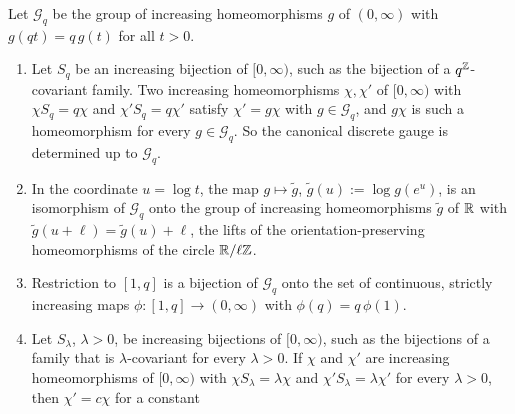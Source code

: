 \begin{lemma}
\label{lem:gauge-group}
\leanok
{}
Let $\mathcal{G}_q$ be the group of increasing homeomorphisms $g$ of $(0,\infty)$ with
$g(qt) = q\,g(t)$ for all $t > 0$.
\begin{enumerate}
\item Let $S_q$ be an increasing bijection of $[0,\infty)$, such as the bijection of a
$q^{\mathbb{Z}}$-covariant family. Two increasing homeomorphisms
$\chi, \chi'$ of $[0,\infty)$ with $\chi S_q = q\chi$ and $\chi'S_q = q\chi'$ satisfy
$\chi' = g\chi$ with $g \in \mathcal{G}_q$, and $g\chi$ is such a homeomorphism for every
$g \in \mathcal{G}_q$. So the canonical discrete gauge is determined up to $\mathcal{G}_q$.
\item In the coordinate $u = \log t$, the map $g \mapsto \tilde g$,
$\tilde g(u) := \log g(e^u)$, is an isomorphism of $\mathcal{G}_q$ onto the group of increasing
homeomorphisms $\tilde g$ of $\mathbb{R}$ with $\tilde g(u + \ell) = \tilde g(u) + \ell$, the lifts of the
orientation-preserving homeomorphisms of the circle $\mathbb{R}/\ell\mathbb{Z}$.
\item Restriction to $[1,q]$ is a bijection of $\mathcal{G}_q$ onto the set of continuous, strictly
increasing maps $\phi : [1,q] \to (0,\infty)$ with $\phi(q) = q\,\phi(1)$.
\item Let $S_\lambda$, $\lambda > 0$, be increasing bijections of $[0,\infty)$, such as the
bijections of a family that is $\lambda$-covariant for every $\lambda > 0$. If $\chi$ and $\chi'$ are
increasing homeomorphisms of $[0,\infty)$ with $\chi S_\lambda = \lambda\chi$ and
$\chi'S_\lambda = \lambda\chi'$ for every $\lambda > 0$, then $\chi' = c\chi$ for a constant

\end{enumerate}
\end{lemma}
